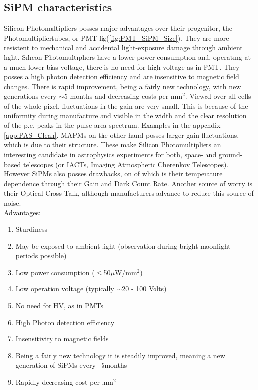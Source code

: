 \documentclass[12pt,article,type=msc,colorback,accentcolor=tud9c]{tudthesis}
\begin{document}
\subsection{SiPM characteristics}
\begin{figure}[t]
\begin{centering}
}
\caption{Structure and carrier multiplication through an avalanche inside a SiPM. Picture from \cite{HPK_SiPM}}
\label{fig:SiPM_scheme}
\end{centering}
\end{figure}
Silicon Photomultipliers posses major advantages over their progenitor, the Photomultipliertubes, or PMT fig(\ref{fig:PMT_SiPM_Size}). They are more resistent to mechanical and accidental light-exposure damage through ambient light. Silicon Photomultipliers have a lower power consumption and, operating at a much lower bias-voltage, there is no need for high-voltage as in PMT. They posses a high photon detection efficiency and are insensitive to magnetic field changes. There is rapid improvement, being a fairly new technology, with new generations every $\sim$5 months and decreasing costs per mm$^2$. Viewed over all cells of the whole pixel, fluctuations in the gain are very small. This is because of the uniformity during manufacture and visible in the width and the clear resolution of the p.e. peaks in the pulse area spectrum. Examples in the appendix {\ref{app:PAS_Clean}}. MAPMs on the other hand posses larger gain fluctuations, which is due to their structure. These make Silicon Photomultipliers an interesting candidate in astrophysics experiments for both, space- and ground-based telescopes (or IACTs, Imaging Atmospheric Cherenkov Telescopes). However SiPMs also posses drawbacks, on of which is their temperature dependence through their Gain and Dark Count Rate. Another source of worry is their Optical Cross Talk, although manufacturers advance to reduce this source of noise.\\
Advantages:
\begin{multicols}{2}
\begin{enumerate}[topsep=0pt,itemsep=-1ex,partopsep=1ex,parsep=1ex]
\item Sturdiness
\item May be exposed to ambient light (observation during bright moonlight periods possible)
\item Low power consumption ($\leq$50$\mu$W/mm$^2$)
\item Low operation voltage (typically $\sim$20 - 100 Volts)
\item No need for HV, as in PMTs
\item High Photon detection efficiency
\item Insensitivity to magnetic fields
\item Being a fairly new technology it is steadily improved, meaning a new generation of SiPMs every ~5months
\item Rapidly decreasing cost per mm$^2$
\end{enumerate}
\end{multicols}
\end{document}
